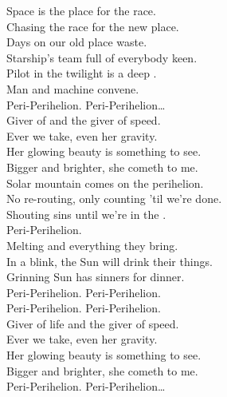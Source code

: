 

Space is the place for the  race. \\
Chasing the race for the new place. \\
Days on our old place waste. \\
Starship's team full of everybody keen. \\
Pilot in the twilight is a deep . \\
Man and machine convene. \\

Peri-Perihelion. Peri-Perihelion… \\

Giver of  and the giver of speed. \\
Ever we take, even her gravity. \\
Her glowing beauty is something to see. \\
Bigger and brighter, she cometh to me. \\

Solar mountain comes on the perihelion. \\
No re-routing, only counting 'til we're done. \\
Shouting sins until we're in the . \\
Peri-Perihelion. \\

Melting  and everything they bring. \\
In a blink, the Sun will drink their things. \\
Grinning Sun has sinners for dinner. \\

Peri-Perihelion. Peri-Perihelion. \\
Peri-Perihelion. Peri-Perihelion. \\

Giver of life and the giver of speed. \\
Ever we take, even her gravity. \\
Her glowing beauty is something to see. \\
Bigger and brighter, she cometh to me. \\

Peri-Perihelion. Peri-Perihelion… \\


